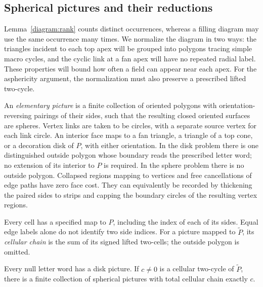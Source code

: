 \subsection{Spherical pictures and their reductions}

Lemma~\ref{diagram:rank} counts distinct occurrences, whereas a filling
diagram may use the same occurrence many times. We normalize the
diagram in two ways: the triangles incident to each top apex will be
grouped into polygons tracing simple macro cycles, and the cyclic
link at a fan apex will have no repeated radial label.
These properties will bound how often a field can appear near each
apex. For the asphericity argument, the normalization must also
preserve a prescribed lifted two-cycle.

An \emph{elementary picture} is a finite collection of oriented polygons with
orientation-reversing pairings of their sides, such that the resulting
closed oriented surfaces are spheres. Vertex links are taken to be
circles, with a separate source vertex for each link circle.
An interior face maps to a fan triangle, a triangle of a top cone, or a
decoration disk of $P$, with either orientation.  In the disk problem
there is one distinguished outside polygon whose boundary reads the
prescribed letter word; no extension of its interior to $P$ is required.
In the sphere problem there is no outside polygon.  Collapsed regions
mapping to vertices and free cancellations of edge paths have zero
face cost.  They can equivalently be recorded by thickening the paired
sides to strips and capping the boundary circles of the resulting
vertex regions.

Every cell has a specified map to $P$, including the index of each of
its sides.  Equal edge labels alone do not identify two side indices.
For a picture mapped to $\widetilde P$, its \emph{cellular chain} is the
sum of its signed lifted two-cells; the outside polygon is omitted.

\begin{lemma}\label{diagram:existence}
Every null letter word has a disk picture.  If
$c\ne0$ is a cellular two-cycle of $\widetilde P$, there is a finite
collection of spherical pictures with total cellular chain exactly
$c$.
\end{lemma}

